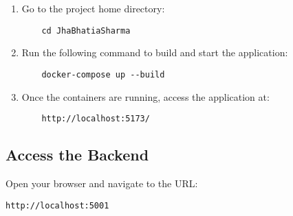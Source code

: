 \begin{enumerate}
    \item Go to the project home directory:
    \begin{verbatim}
    cd JhaBhatiaSharma
    \end{verbatim}

    \item Run the following command to build and start the application:
    \begin{verbatim}
    docker-compose up --build
    \end{verbatim}

    \item Once the containers are running, access the application at:
    \begin{verbatim}
    http://localhost:5173/
    \end{verbatim}
\end{enumerate}

\subsection{Access the Backend}
Open your browser and navigate to the URL:
\begin{verbatim}
http://localhost:5001
\end{verbatim}



